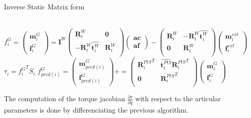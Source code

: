 \begin{algorithm}
  \caption{Inverse Static Matrix form}
  \label{ISmatrix}
\begin{algorithmic}
  \\
  $f^G_i =
  \begin{pmatrix}
    \mathbf{m}^{G}_i \\ \mathbf{f}^{G}_i
  \end{pmatrix}
  =
  \mathbf{I}^W
  \begin{pmatrix}
    {\mathbf{R}^W_i} & \mathbf{0} \\
    -{\mathbf{R}^W_i}\widehat{\mathbf{t}^W_i} & {\mathbf{R}^W_i} \\
  \end{pmatrix}
  \begin{pmatrix}
    \mathbf{ac} \\ \mathbf{af}
  \end{pmatrix}
  -
  \begin{pmatrix}
    {\mathbf{R}^W_i} & -{\mathbf{R}^W_i}\widehat{\mathbf{t}^W_i} \\
    \mathbf{0} & {\mathbf{R}^W_i} \\
  \end{pmatrix}
  \begin{pmatrix}
    \mathbf{m}^{ext}_i \\ \mathbf{f}^{ext}_i
  \end{pmatrix}
  $
  \EndFor
  \State $\tau_i = {f^G_i}^T S_i$
  \State $f^G_{pred(i)} =
  \begin{pmatrix}
    \mathbf{m}^{G}_{pred(i)} \\ \mathbf{f}^{G}_{pred(i)}
  \end{pmatrix}
  +=
  \begin{pmatrix}
    {\mathbf{R}^{PtS}_i}^T & \widehat{\mathbf{t}^{PtS}_i}{\mathbf{R}^{PtS}_i}^T \\
    \mathbf{0} & {\mathbf{R}^{PtS}_i}^T \\
  \end{pmatrix}
  \begin{pmatrix}
    \mathbf{m}^{G}_i \\ \mathbf{f}^{G}_i
  \end{pmatrix}
  $
  \EndIf
  \EndFor
\end{algorithmic}
\end{algorithm}

The computation of the torque jacobian $\frac{\partial \tau}{\partial q}$ with respect to the articular parameters is done by differenciating the previous algorithm.

